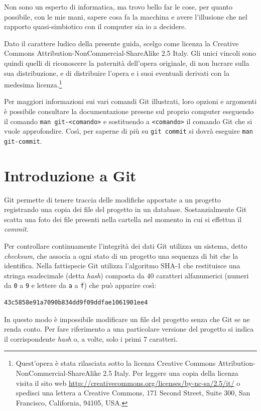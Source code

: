 \documentclass[a4paper,12pt,oneside]{article}
\begin{document}
Non sono un esperto di informatica, ma trovo bello far le cose, per quanto
possibile, con le mie mani, sapere cosa fa la macchina e avere l'illusione che
nel rapporto quasi-simbiotico con il computer sia io a decidere.

Dato il carattere ludico della presente guida, scelgo come licenza la Creative
Commons Attribution-NonCommercial-ShareAlike 2.5 Italy. Gli unici vincoli sono
quindi quelli di riconoscere la paternità dell'opera
originale, di non lucrare sulla sua distribuzione, e di distribuire l'opera e
i suoi eventuali derivati con la medesima licenza.\footnote{
  Quest'opera è stata rilasciata sotto la licenza
  Creative Commons Attribution-NonCommercial-ShareAlike 2.5 Italy.
  Per leggere una copia della licenza visita il sito web
  \url{http://creativecommons.org/licenses/by-nc-sa/2.5/it/}
  o spedisci una lettera a Creative Commons, 171 Second Street, Suite 300, San
  Francisco, California, 94105, USA.}

Per maggiori informazioni sui vari comandi Git illustrati, loro opzioni e
argomenti è possibile consultare la documentazione presene sul proprio computer
eseguendo il comando \lstinline|man git-<comando>| e sostituendo a
\lstinline|<comando>| il comando Git che si vuole approfondire. Così, per
saperne di più su \lstinline|git commit| si dovrà eseguire
\lstinline|man git-commit|.

\section{Introduzione a Git}
\label{sec:introduzione-git}

Git permette di tenere traccia delle modifiche apportate a un progetto registrando
una copia dei file del progetto in un database. Sostanzialmente Git scatta una
foto dei file presenti nella cartella nel momento in cui si effettua il
\emph{commit}.

Per controllare continuamente l'integrità dei dati Git utilizza un sistema, detto
\emph{checksum}, che associa a ogni stato di un progetto una sequenza di bit che
la identifica. Nella fattispecie Git utilizza l'algoritmo SHA-1 che restituisce
una stringa esadecimale (detta \emph{hash}) composta da $40$ caratteri
alfanumerici (numeri da \lstinline|0| a \lstinline|9| e lettere da \lstinline|a|
a \lstinline|f|) che può apparire così:
\begin{lstlisting}
43c5858e91a7090b834dd9f09ddfae1061901ee4
\end{lstlisting}
In questo modo è impossibile modificare un file del progetto senza che Git se
ne renda conto. Per fare riferimento a una particolare versione del progetto
si indica il corrispondente \emph{hash} o, a volte, solo i primi $7$ caratteri.
\end{document}
